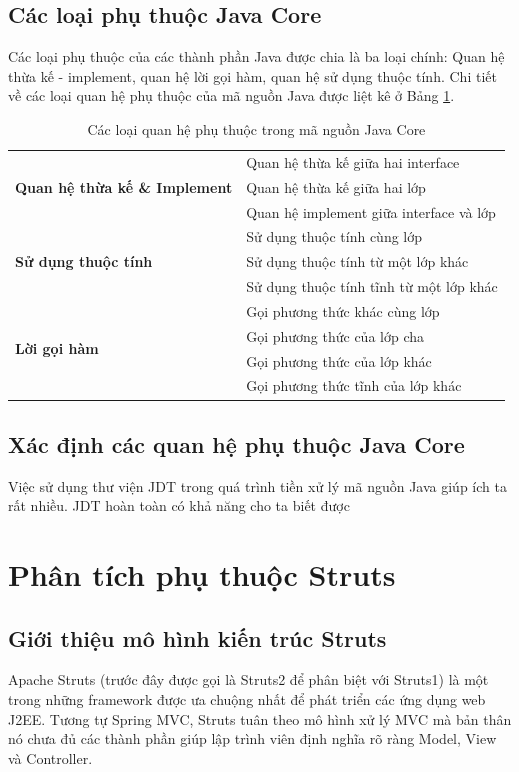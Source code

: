 \documentclass[12pt,a4paper]{report}
\begin{document}
\subsection{Các loại phụ thuộc Java Core}
Các loại phụ thuộc của các thành phần Java được chia là ba loại chính: Quan hệ thừa kế - implement, quan hệ lời gọi hàm, quan hệ sử dụng thuộc tính. Chi tiết về các loại quan hệ phụ thuộc của mã nguồn Java được liệt kê ở Bảng \ref{tbl:javacore-dependencies}.\\

\begin{table}[h]
\centering
\caption{Các loại quan hệ phụ thuộc trong mã nguồn Java Core}
\label{tbl:javacore-dependencies}
\begin{tabular}{|l|l|}
\hline
\multirow{3}{*}{\textbf{Quan hệ thừa kế \& Implement}} & Quan hệ thừa kế giữa hai interface \\ \cline{2-2} 
 & Quan hệ thừa kế giữa hai lớp \\ \cline{2-2} 
 & Quan hệ implement giữa interface và lớp \\ \hline
\multirow{3}{*}{\textbf{Sử dụng thuộc tính}} & Sử dụng thuộc tính cùng lớp \\ \cline{2-2} 
 & Sử dụng thuộc tính từ một lớp khác \\ \cline{2-2} 
 & Sử dụng thuộc tính tĩnh từ một lớp khác \\ \hline
\multirow{4}{*}{\textbf{Lời gọi hàm}} & Gọi phương thức khác cùng lớp \\ \cline{2-2} 
 & Gọi phương thức của lớp cha \\ \cline{2-2} 
 & Gọi phương thức của lớp khác \\ \cline{2-2} 
 & Gọi phương thức tĩnh của lớp khác \\ \hline
\end{tabular}
\end{table}

\subsection{Xác định các quan hệ phụ thuộc Java Core}
Việc sử dụng thư viện JDT trong quá trình tiền xử lý mã nguồn Java giúp ích ta rất nhiều. JDT hoàn toàn có khả năng cho ta biết được 

\section{Phân tích phụ thuộc Struts}
\subsection{Giới thiệu mô hình kiến trúc Struts}
Apache Struts (trước đây được gọi là Struts2 để phân biệt với Struts1) là một trong những framework được ưa chuộng nhất để phát triển các ứng dụng web J2EE. Tương tự Spring MVC, Struts tuân theo mô hình xử lý MVC mà bản thân nó chưa đủ các thành phần giúp lập trình viên định nghĩa rõ ràng Model, View và Controller.\\
\end{document}
